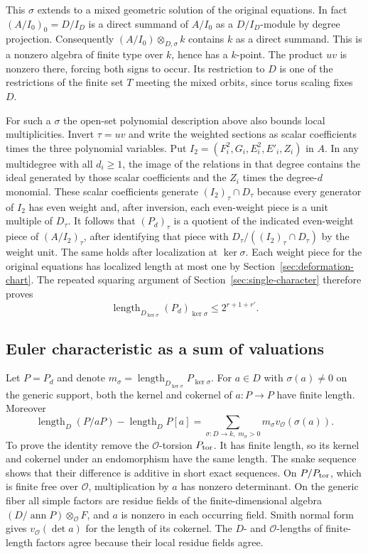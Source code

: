 This \(\sigma\) extends to a mixed geometric solution of the original
equations. In fact \((A/I_0)_0=D/I_D\) is a direct summand of
\(A/I_0\) as a \(D/I_D\)-module by degree projection.
Consequently \((A/I_0)\otimes_{D,\sigma} k\) contains \(k\) as a
direct summand. This is a nonzero algebra of finite type over \(k\),
hence has a \(k\)-point. The product \(uv\) is nonzero there,
forcing both signs to occur. Its restriction to \(D\) is one of
the restrictions of the finite set \(T\) meeting the mixed orbits,
since torus scaling fixes \(D\).

For such a \(\sigma\) the open-set polynomial description above
also bounds local multiplicities. Invert \(\tau=uv\) and write
the weighted sections as scalar coefficients times the three
polynomial variables. Put \(I_2=(F_i^2,G_i,E_i^2,E'_i,Z_i)\) in
\(A\). In any multidegree with all \(d_i\ge1\), the image of the
relations in that degree contains the ideal generated by those
scalar coefficients and the \(Z_i\) times the degree-\(d\) monomial.
These scalar coefficients generate \((I_2)_\tau\cap D_\tau\)
because every generator of \(I_2\) has even weight and, after
inversion, each even-weight piece is a unit multiple of \(D_\tau\).
It follows that \((P_d)_\tau\) is a quotient of the indicated
even-weight piece of \((A/I_2)_\tau\), after identifying that
piece with \(D_\tau/((I_2)_\tau\cap D_\tau)\) by the weight unit.
The same holds after localization at \(\ker\sigma\). Each weight
piece for the original equations has localized length at most one
by Section~\ref{sec:deformation-chart}. The repeated squaring
argument of Section~\ref{sec:single-character} therefore proves
\[
             \operatorname{length}_{D_{\ker\sigma}}
                 (P_d)_{\ker\sigma}\le 2^{r+1+r'} .
\]

\subsection{Euler characteristic as a sum of valuations}

Let \(P=P_d\) and denote \(m_\sigma=
\operatorname{length}_{D_{\ker\sigma}}P_{\ker\sigma}\).
For \(a\in D\) with \(\sigma(a)\ne0\) on the generic support,
both the kernel and cokernel of \(a:P\to P\) have finite length.
Moreover
\[
  \operatorname{length}_D(P/aP)-\operatorname{length}_D P[a]
       =\sum_{\sigma:D\to k,\;m_\sigma>0}
                    m_\sigma v_{\mathcal O}(\sigma(a)).
\]
To prove the identity remove the \(\mathcal O\)-torsion \(P_{\rm tor}\).
It has finite length, so its kernel and cokernel under an endomorphism
have the same length. The snake sequence shows that their difference
is additive in short exact sequences. On \(P/P_{\rm tor}\), which
is finite free over \(\mathcal O\), multiplication by \(a\) has
nonzero determinant. On the generic fiber all simple factors are
residue fields of the finite-dimensional algebra
\((D/\operatorname{ann}P)\otimes_{\mathcal O}F\), and \(a\) is
nonzero in each occurring field. Smith normal form gives
\(v_{\mathcal O}(\det a)\) for the length of its cokernel. The
\(D\)- and \(\mathcal O\)-lengths of finite-length factors agree
because their local residue fields agree.

